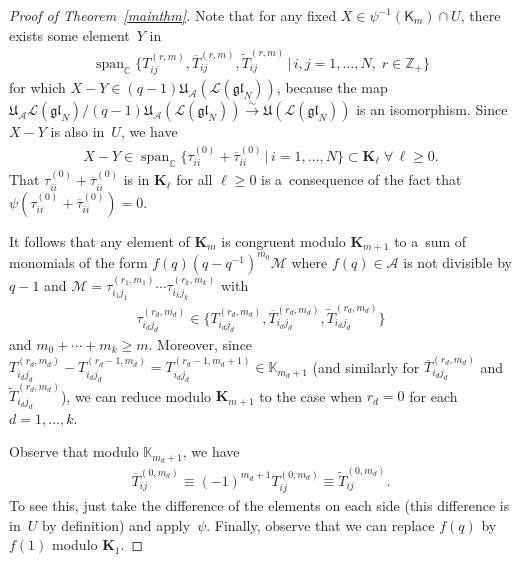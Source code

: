 \begin{proof}[Proof of Theorem~\ref{mainthm}]
Note that for any f\/ixed $X \in \psi^{-1}(\mathsf{K}_m) \cap U$, there exists some element~$Y$ in
 \begin{gather*}
\operatorname{span}_{\mathbb{C}}\big\{T_{ij}^{(r,m)},\overline{T}_{ij}^{(r,m)},\widetilde{T}_{ij}^{(r,m)} \,|\, i,j=1,\ldots,N,\; r \in
\mathbb{Z}_+\big\}
\end{gather*}
for which $X-Y \in (q-1)\mathfrak{U}_{\mathcal{A}}(\mathcal{L}(\mathfrak{gl}_N))$, because the map
$\mathfrak{U}_{\mathcal{A}}\mathcal{L}(\mathfrak{gl}_N)
/(q-1)\mathfrak{U}_{\mathcal{A}}(\mathcal{L}(\mathfrak{gl}_N))
\stackrel{\sim}{\longrightarrow} \mathfrak{U}(\mathcal{L}(\mathfrak{gl}_N))$ is an isomorphism.
Since $X-Y$ is also in~$U$, we have{\samepage
\begin{gather*}
X-Y \in \operatorname{span}_{\mathbb{C}} \big\{\tau_{ii}^{(0)}+\overline{\tau}_{ii}^{(0)} \,|\, i=1,\ldots,N\big\} \subset \mathbf{K}_{\ell}
 \; \forall\, \ell \geq 0.
\end{gather*}
That $\tau_{ii}^{(0)}+\overline{\tau}_{ii}^{(0)}$ is in $\mathbf{K}_{\ell}$ for all $\ell \geq 0$ is a~consequence of the
fact that $\psi(\tau_{ii}^{(0)}+\overline{\tau}_{ii}^{(0)})=0$.}

It follows that any element of $\mathbf{K}_m$ is congruent modulo $\mathbf{K}_{m+1}$ to a~sum of monomials of the form
$f(q)(q-q^{-1})^{m_0}\mathcal{M}$ where $f(q) \in \mathcal{A}$ is not divisible by $q-1$ and $\mathcal{M}=\tau_{i_1
j_1}^{(r_1,m_1)} \cdots \tau_{i_k j_k}^{(r_k,m_k)}$ with
\begin{gather*}
\tau_{i_d j_d}^{(r_d,m_d)} \in \big\{T_{i_d j_d}^{(r_d,m_d)}, \overline{T}_{i_d j_d}^{(r_d,m_d)}, \widetilde{T}_{i_d
j_d}^{(r_d,m_d)}\big\}
\end{gather*}
and $m_0+\cdots+m_k \geq m$.
Moreover, since $T_{i_d j_d}^{(r_d,m_d)}-T_{i_d j_d}^{(r_d-1,m_d)}=T_{i_d j_d}^{(r_d-1,m_d+1)} \in \mathbb{K}_{m_d+1}$
(and similarly for $\overline{T}_{i_d j_d}^{(r_d,m_d)}$ and $\widetilde{T}_{i_d j_d}^{(r_d,m_d)}$), we can reduce modulo
$\mathbf{K}_{m+1}$ to the case when $r_d=0$ for each $d=1,\ldots,k$.

Observe that modulo $\mathbb{K}_{m_d+1}$, we have
\begin{gather}
\overline{T}_{ij}^{(0,m_d)} \equiv (-1)^{m_d+1}T_{ij}^{(0,m_d)} \equiv \widetilde{T}_{ij}^{(0,m_d)}.
\label{TbarT}
\end{gather}
To see this, just take the dif\/ference of the elements on each side (this dif\/ference is in~$U$ by def\/inition) and
apply~$\psi$.
Finally, observe that we can replace $f(q)$ by $f(1)$ modulo $\mathbf{K}_{1}$.


\end{proof}

